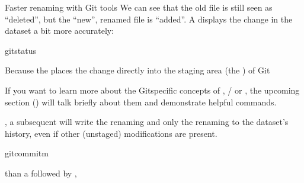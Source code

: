 \begin{findoutmore}[label={fom-gitmv}, before title={\thetcbcounter\ }, check odd page=true]{Faster renaming with Git tools}
\sphinxAtStartPar
We can see that the old file is still seen as “deleted”, but the “new”,
renamed file is “added”. A  displays the change
in the dataset a bit more accurately:

\begin{sphinxVerbatim}[commandchars=\\\{\}]
gitstatus
\end{sphinxVerbatim}

\sphinxAtStartPar
Because the  places the change directly into the
staging area (the ) of Git%
\begin{footnote}\sphinxAtStartFootnote
If you want to learn more about the Git\sphinxhyphen{}specific concepts of ,
/ or , the upcoming section {\hyperref[\detokenize{basics/101-137-history:history}]{}} () will
talk briefly about them and demonstrate helpful commands.
%
\end{footnote},
a subsequent  will write the renaming
\textendash{} and only the renaming \textendash{} to the dataset’s history, even if other
(unstaged) modifications are present.

\begin{sphinxVerbatim}[commandchars=\\\{\}]
gitcommit\PYGZhy{}m
\end{sphinxVerbatim}

\sphinxAtStartPar
{} than a  followed by ,


\end{findoutmore}

